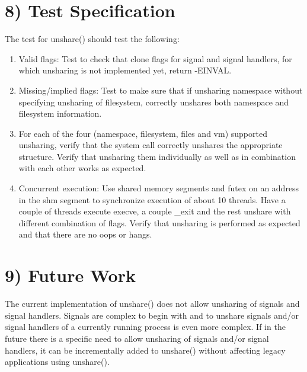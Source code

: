 \documentclass[a4paper,8pt,english]{sphinxmanual}
\begin{document}
\section{8) Test Specification}
\label{userspace-api/unshare:test-specification}
The test for unshare() should test the following:
\begin{enumerate}
\item {} 
Valid flags: Test to check that clone flags for signal and
signal handlers, for which unsharing is not implemented
yet, return -EINVAL.

\item {} 
Missing/implied flags: Test to make sure that if unsharing
namespace without specifying unsharing of filesystem, correctly
unshares both namespace and filesystem information.

\item {} 
For each of the four (namespace, filesystem, files and vm)
supported unsharing, verify that the system call correctly
unshares the appropriate structure. Verify that unsharing
them individually as well as in combination with each
other works as expected.

\item {} 
Concurrent execution: Use shared memory segments and futex on
an address in the shm segment to synchronize execution of
about 10 threads. Have a couple of threads execute execve,
a couple \_exit and the rest unshare with different combination
of flags. Verify that unsharing is performed as expected and
that there are no oops or hangs.

\end{enumerate}


\section{9) Future Work}
\label{userspace-api/unshare:future-work}
The current implementation of unshare() does not allow unsharing of
signals and signal handlers. Signals are complex to begin with and
to unshare signals and/or signal handlers of a currently running
process is even more complex. If in the future there is a specific
need to allow unsharing of signals and/or signal handlers, it can
be incrementally added to unshare() without affecting legacy
applications using unshare().



\renewcommand{\indexname}{Index}
\printindex
\end{document}
